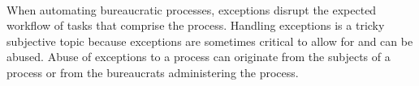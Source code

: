 \ \\

When automating bureaucratic processes, exceptions disrupt the expected workflow of tasks that comprise the process. Handling exceptions is a tricky subjective topic because exceptions are sometimes critical to allow for and can be abused. Abuse of exceptions to a process can originate from the subjects of a process or from the bureaucrats administering the process.